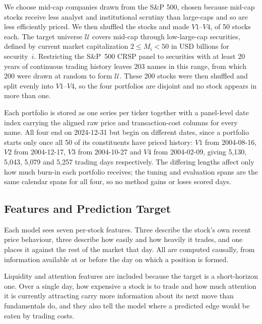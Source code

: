 We choose mid-cap companies drawn from the S\&P 500, chosen because mid-cap stocks receive less analyst and institutional scrutiny than large-caps and so are less efficiently priced. We then shuffled the stocks and made $V1$--$V4$, of 50 stocks each.
The target universe $\mathcal{U}$ covers mid-cap through low-large-cap securities, defined by current market capitalization $2 \le M_i < 50$ in USD billions for security~$i$.
Restricting the S\&P~500 CRSP panel to securities with at least 20 years of continuous trading history leaves 203 names in this range, from which 200 were drawn at random to form $\mathcal{U}$.
These 200 stocks were then shuffled and split evenly into $V1$--$V4$, so the four portfolios are disjoint and no stock appears in more than one.



Each portfolio is stored as one series per ticker together with a
panel-level date index carrying the aligned raw price and
transaction-cost columns for every name. All four end on 2024-12-31 but
begin on different dates, since a portfolio starts only once all 50 of
its constituents have priced history: $V1$ from 2004-08-16, $V2$ from
2004-12-17, $V3$ from 2004-10-27 and $V4$ from 2004-02-09, giving
5{,}130, 5{,}043, 5{,}079 and 5{,}257 trading days respectively. The
differing lengths affect only how much burn-in each portfolio receives;
the tuning and evaluation spans are the same calendar spans for all
four, so no method gains or loses scored days.

\subsection{Features and Prediction Target}
Each model sees seven per-stock features. Three describe the stock's own
recent price behaviour, three describe how easily and how heavily it
trades, and one places it against the rest of the market that day. All
are computed causally, from information available at or before the day
on which a position is formed.

Liquidity and attention features are included because the target is a
short-horizon one. Over a single day, how expensive a stock is to trade
and how much attention it is currently attracting carry more information
about its next move than fundamentals do, and they also tell the model
where a predicted edge would be eaten by trading costs.

